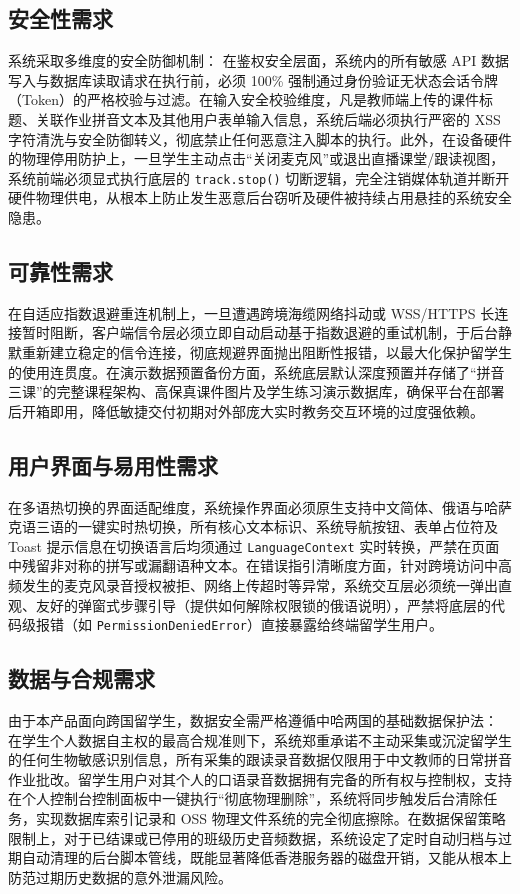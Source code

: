 \subsection{安全性需求}
系统采取多维度的安全防御机制：
在鉴权安全层面，系统内的所有敏感 API 数据写入与数据库读取请求在执行前，必须 100\% 强制通过身份验证无状态会话令牌（Token）的严格校验与过滤。在输入安全校验维度，凡是教师端上传的课件标题、关联作业拼音文本及其他用户表单输入信息，系统后端必须执行严密的 XSS 字符清洗与安全防御转义，彻底禁止任何恶意注入脚本的执行。此外，在设备硬件的物理停用防护上，一旦学生主动点击“关闭麦克风”或退出直播课堂/跟读视图，系统前端必须显式执行底层的 \texttt{track.stop()} 切断逻辑，完全注销媒体轨道并断开硬件物理供电，从根本上防止发生恶意后台窃听及硬件被持续占用悬挂的系统安全隐患。

\subsection{可靠性需求}
在自适应指数退避重连机制上，一旦遭遇跨境海缆网络抖动或 WSS/HTTPS 长连接暂时阻断，客户端信令层必须立即自动启动基于指数退避的重试机制，于后台静默重新建立稳定的信令连接，彻底规避界面抛出阻断性报错，以最大化保护留学生的使用连贯度。在演示数据预置备份方面，系统底层默认深度预置并存储了“拼音三课”的完整课程架构、高保真课件图片及学生练习演示数据库，确保平台在部署后开箱即用，降低敏捷交付初期对外部庞大实时教务交互环境的过度强依赖。

\subsection{用户界面与易用性需求}
在多语热切换的界面适配维度，系统操作界面必须原生支持中文简体、俄语与哈萨克语三语的一键实时热切换，所有核心文本标识、系统导航按钮、表单占位符及 Toast 提示信息在切换语言后均须通过 \texttt{LanguageContext} 实时转换，严禁在页面中残留非对称的拼写或漏翻语种文本。在错误指引清晰度方面，针对跨境访问中高频发生的麦克风录音授权被拒、网络上传超时等异常，系统交互层必须统一弹出直观、友好的弹窗式步骤引导（提供如何解除权限锁的俄语说明），严禁将底层的代码级报错（如 \texttt{PermissionDeniedError}）直接暴露给终端留学生用户。

\subsection{数据与合规需求}
由于本产品面向跨国留学生，数据安全需严格遵循中哈两国的基础数据保护法：
在学生个人数据自主权的最高合规准则下，系统郑重承诺不主动采集或沉淀留学生的任何生物敏感识别信息，所有采集的跟读录音数据仅限用于中文教师的日常拼音作业批改。留学生用户对其个人的口语录音数据拥有完备的所有权与控制权，支持在个人控制台控制面板中一键执行“彻底物理删除”，系统将同步触发后台清除任务，实现数据库索引记录和 OSS 物理文件系统的完全彻底擦除。在数据保留策略限制上，对于已结课或已停用的班级历史音频数据，系统设定了定时自动归档与过期自动清理的后台脚本管线，既能显著降低香港服务器的磁盘开销，又能从根本上防范过期历史数据的意外泄漏风险。

